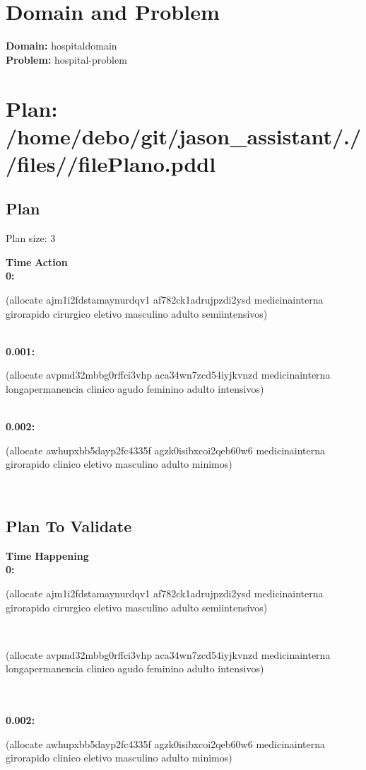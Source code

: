 \documentclass[a4paper,12pt]{article}
\author{\mbox{\sc {\sc Val}}}
\newcommand{\headingtimeaction}{{\bf Time} \qquad \= {\bf Action}\\[0.8ex]}
\newcommand{\headingtimehappening}{{\bf Time} \qquad \= {\bf Happening}\\[0.8ex]}
\newcommand{\atime}[1]{{\bf #1:}}
\newcommand{\action}[1]{{\sf #1}}
\newcommand{\listrow}[1]{\begin{minipage}[t]{11.5cm} #1 \end{minipage}}
\begin{document}
 \maketitle 
\section{Domain and Problem}
{\bf Domain:} hospitaldomain\\
{\bf Problem:} hospital-problem
\section{\sloppy Plan: /\-home/\-debo/\-git/\-jason\_assistant/\-./\-/\-files/\-/\-filePlano.pddl}
\subsection{Plan}
Plan size: 3
\begin{tabbing}
\headingtimeaction 
\atime{0} \> \listrow{\action{(allocate ajm1i2fdstamaynurdqv1 af782ck1adrujpzdi2ysd medicinainterna girorapido cirurgico eletivo masculino adulto semiintensivos)}}\\
\atime{0.001} \> \listrow{\action{(allocate avpmd32mbbg0rffci3vhp aca34wn7zcd54iyjkvnzd medicinainterna longapermanencia clinico agudo feminino adulto intensivos)}}\\
\atime{0.002} \> \listrow{\action{(allocate awhupxbb5dayp2fc4335f agzk0isibxcoi2qeb60w6 medicinainterna girorapido clinico eletivo masculino adulto minimos)}}\\
\end{tabbing}
\subsection{Plan To Validate}
\begin{tabbing}
\headingtimehappening 
\atime{0}  \> \listrow{\action{(allocate ajm1i2fdstamaynurdqv1 af782ck1adrujpzdi2ysd medicinainterna girorapido cirurgico eletivo masculino adulto semiintensivos)}}\\ \> \listrow{\action{(allocate avpmd32mbbg0rffci3vhp aca34wn7zcd54iyjkvnzd medicinainterna longapermanencia clinico agudo feminino adulto intensivos)}}\\
\\\atime{0.002}  \> \listrow{\action{(allocate awhupxbb5dayp2fc4335f agzk0isibxcoi2qeb60w6 medicinainterna girorapido clinico eletivo masculino adulto minimos)}}\\
\end{tabbing}
\end{document}
